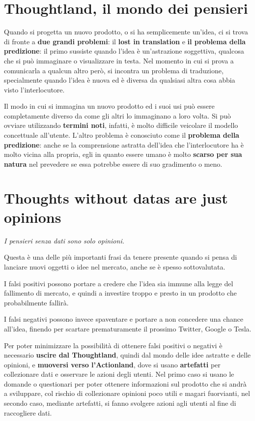 \documentclass[a4paper,11pt,oneside]{book}
\begin{document}
\section{Thoughtland, il mondo dei pensieri}
Quando si progetta un nuovo prodotto, o si ha semplicemente un'idea, ci si trova di fronte a \textbf{due grandi problemi}: il \textbf{lost in translation} e \textbf{il problema della predizione}: il primo sussiste quando l'idea è un'astrazione soggettiva, qualcosa che si può immaginare o visualizzare in testa. Nel momento in cui si prova a comunicarla a qualcun altro però, si incontra un problema
di traduzione, specialmente quando l'idea è nuova ed è diversa da qualsiasi altra cosa
abbia visto l'interlocutore.

Il modo in cui si immagina un nuovo prodotto ed i suoi usi può essere completamente diverso da come gli altri lo immaginano a loro volta. Si può ovviare utilizzando \textbf{termini noti}, infatti, è molto difficile veicolare il modello concettuale all'utente. L'altro problema è conosciuto come il \textbf{problema della predizione}: anche se la comprensione astratta dell'idea che l'interlocutore ha è molto vicina alla propria, egli in quanto essere umano è molto \textbf{scarso per sua natura} nel prevedere se essa potrebbe essere di suo gradimento o meno.

\pagebreak

\section{Thoughts without datas are just opinions}

\begin{flushleft}
	\textit{I pensieri senza dati sono solo opinioni.}
\end{flushleft}

Questa è una delle più importanti frasi da tenere presente quando si pensa di lanciare nuovi oggetti o idee nel mercato, anche se è spesso sottovalutata.

I falsi positivi possono portare a credere che l'idea sia immune alla legge del
fallimento di mercato, e quindi a investire troppo e presto in un prodotto che probabilmente fallirà.

I falsi negativi possono invece spaventare e portare a non concedere una chance all'idea, finendo per scartare prematuramente il prossimo Twitter, Google o Tesla.

Per poter minimizzare la possibilità di ottenere falsi positivi o negativi è necessario \textbf{uscire dal Thoughtland}, quindi dal mondo delle idee astratte e delle opinioni, e \textbf{muoversi verso l'Actionland}, dove si usano \textbf{artefatti} per collezionare dati e osservare le azioni degli utenti. Nel primo caso si usano le domande o questionari per poter ottenere informazioni sul prodotto
che si andrà a sviluppare, col rischio di collezionare opinioni poco utili e magari fuorvianti, nel secondo caso, mediante artefatti, si fanno svolgere azioni agli utenti al fine di raccogliere dati.
\end{document}
